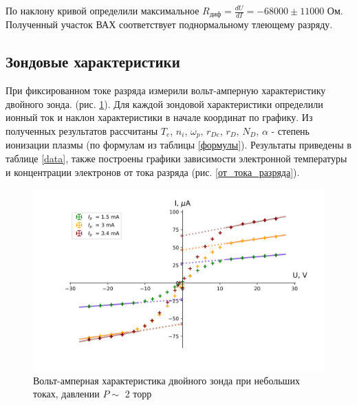 \documentclass[a4paper,12pt]{article} %
\begin{document}
По наклону кривой определили максимальное $R_{диф}=\frac{dU}{dI} = -68000 \pm 11000$ Ом. Полученный участок ВАХ соответствует поднормальному тлеющему разряду.

\subsection{Зондовые характеристики} 
При фиксированном токе разряда измерили вольт-амперную характеристику двойного зонда. (рис. \ref{ВАХ_зонда}). Для каждой зондовой характеристики определили ионный ток и наклон характеристики в начале координат по графику. Из полученных результатов рассчитаны $T_e$, $n_i$, $\omega_p$, $r_{De}$, $r_D$, $N_D$, $\alpha$ - степень ионизации плазмы (по формулам из таблицы \ref{формулы}). Результаты приведены в таблице \ref{data}, также построены графики зависимости 
электронной температуры и концентрации электронов от тока разряда (рис. \ref{от_тока_разряда}).

\begin{figure}[h!]
\begin{center}
\includegraphics[width=\textwidth]{I(U)_probe}
\caption{Вольт-амперная характеристика двойного зонда при небольших токах, давлении $P \sim$ 2 торр} \label{ВАХ_зонда}
\end{center}
\end{figure}
\end{document}
